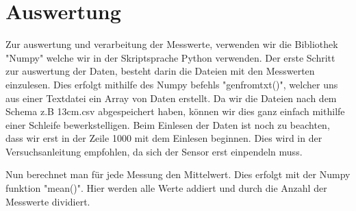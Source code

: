 \documentclass[TGAI_Laborbericht.tex]{subfiles}
\begin{document}
\section{Auswertung}
\label{chap:VERSUCH_1_AUSWERTUNG}
\begin{flushleft}
Zur auswertung und verarbeitung der Messwerte, verwenden wir die Bibliothek "Numpy" welche wir in der Skriptsprache Python verwenden. Der erste Schritt zur auswertung der Daten, besteht darin die Dateien mit den Messwerten einzulesen. Dies erfolgt mithilfe des Numpy befehls "genfromtxt()", welcher uns aus einer Textdatei ein Array von Daten erstellt. Da wir die Dateien nach dem Schema z.B 13cm.csv abgespeichert haben, können wir dies ganz einfach mithilfe einer Schleife bewerkstelligen. Beim Einlesen der Daten ist noch zu beachten, dass wir erst in der Zeile 1000 mit dem Einlesen beginnen. Dies wird in der Versuchsanleitung empfohlen, da sich der Sensor erst einpendeln muss. 

Nun berechnet man für jede Messung den Mittelwert. Dies erfolgt mit der Numpy funktion "mean()". Hier werden alle Werte addiert und durch die Anzahl der Messwerte dividiert.




\end{flushleft}
\end{document}
